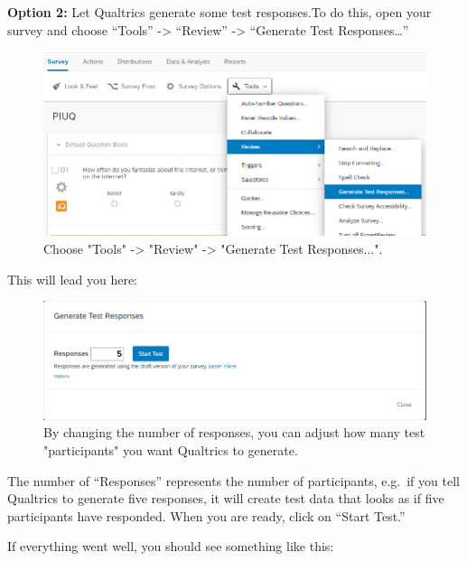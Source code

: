 \documentclass[
]{book}
\begin{document}
\textbf{Option 2:} Let Qualtrics generate some test responses.To do this, open your survey and choose ``Tools'' -\textgreater{} ``Review'' -\textgreater{} ``Generate Test Responses\ldots{}''

\begin{figure}

{\centering \includegraphics[width=0.85\linewidth]{images/Qualtrics/09testresponses1} 

}

\caption{Choose "Tools" -> "Review" -> "Generate Test Responses...".}\label{fig:Figure11-8}
\end{figure}

This will lead you here:

\begin{figure}

{\centering \includegraphics[width=0.85\linewidth]{images/Qualtrics/10testresponses2} 

}

\caption{By changing the number of responses, you can adjust how many test "participants" you want Qualtrics to generate.}\label{fig:Figure11-9}
\end{figure}

The number of ``Responses'' represents the number of participants, e.g.~if you tell Qualtrics to generate five responses, it will create test data that looks as if five participants have responded. When you are ready, click on ``Start Test.''

If everything went well, you should see something like this:
\end{document}
